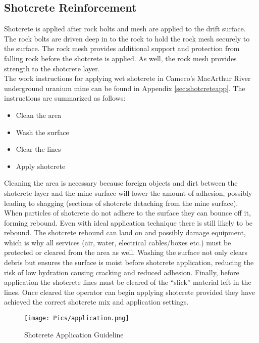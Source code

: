 \subsection{Shotcrete Reinforcement}

Shotcrete is applied after rock bolts and mesh are applied to the drift surface. The rock bolts are driven deep in to the rock to hold the rock mesh securely to the surface. The rock mesh provides additional support and protection from falling rock before the shotcrete is applied. As well, the rock mesh provides strength to the shotcrete layer.\\

The work instructions for applying wet shotcrete in Cameco's MacArthur River underground uranium mine can be found in Appendix \ref{sec:shotcreteapp}. The instructions are summarized as follows:
\begin{itemize}
\item Clean the area
\item Wash the surface
\item Clear the lines
\item Apply shotcrete
\end{itemize}

Cleaning the area is necessary because foreign objects and dirt between the shotcrete layer and the mine surface will lower the amount of adhesion, possibly leading to shagging (sections of shotcrete detaching from the mine surface). When particles of shotcrete do not adhere to the surface they can bounce off it, forming rebound. Even with ideal application technique there is still likely to be rebound. The shotcrete rebound can land on and possibly damage equipment, which is why all services (air, water, electrical cables/boxes etc.) must be protected or cleared from the area as well. Washing the surface not only clears debris but ensures the surface is moist before shotcrete application, reducing the risk of low hydration causing cracking and reduced adhesion. Finally, before application the shotcrete lines must be cleared of the ``slick'' material left in the lines. Once cleared the operator can begin applying shotcrete provided they have achieved the correct shotcrete mix and application settings.\\

\begin{figure}[h!]
    \centering
    \texttt{[image: Pics/application.png]}
    \caption{Shotcrete Application Guideline \cite{camedoc}}
    \label{fig:instshot}
\end{figure}

